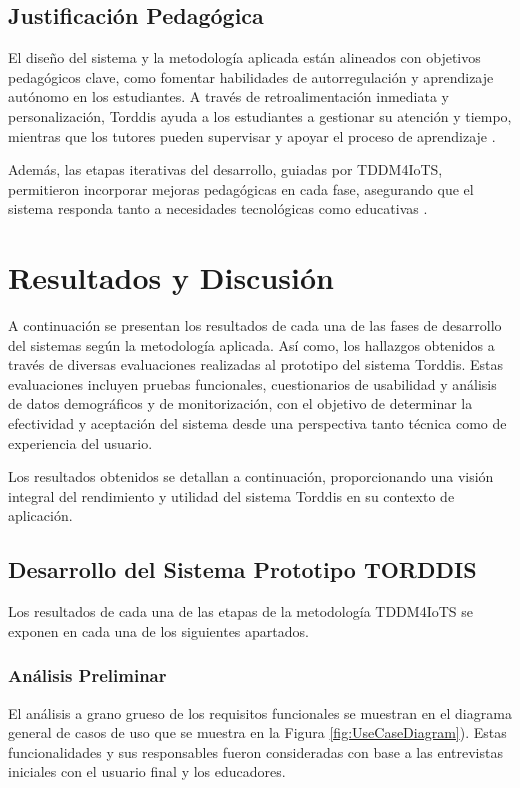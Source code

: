 \documentclass[a4paper,fleqn]{cas-sc}
\begin{document}
		\subsection{Justificación Pedagógica}
			El diseño del sistema y la metodología aplicada están alineados con objetivos pedagógicos clave, como fomentar habilidades de autorregulación y aprendizaje autónomo en los estudiantes. A través de retroalimentación inmediata y personalización, Torddis ayuda a los estudiantes a gestionar su atención y tiempo, mientras que los tutores pueden supervisar y apoyar el proceso de aprendizaje \citep{Chen2025Unpacking}.
			
			Además, las etapas iterativas del desarrollo, guiadas por TDDM4IoTS, permitieron incorporar mejoras pedagógicas en cada fase, asegurando que el sistema responda tanto a necesidades tecnológicas como educativas \citep{Huang2025How}.
			
	\section{Resultados y Discusión}
	\label{seccion:Cinco}
		A continuación se presentan los resultados de cada una de las fases de desarrollo del sistemas según la metodología aplicada. Así como, los hallazgos obtenidos a través de diversas evaluaciones realizadas al prototipo del sistema Torddis. Estas evaluaciones incluyen pruebas funcionales, cuestionarios de usabilidad y análisis de datos demográficos y de monitorización, con el objetivo de determinar la efectividad y aceptación del sistema desde una perspectiva tanto técnica como de experiencia del usuario.
		
		Los resultados obtenidos se detallan a continuación, proporcionando una visión integral del rendimiento y utilidad del sistema Torddis en su contexto de aplicación.
		
		\subsection{Desarrollo del Sistema Prototipo TORDDIS}
			Los resultados de cada una de las etapas de la metodología TDDM4IoTS \citep{Guerrero-Ulloa2020TDDM4IoTS} se exponen en cada una de los siguientes apartados.
			
			\subsubsection{Análisis Preliminar}
				El análisis a grano grueso de los requisitos funcionales se muestran en el diagrama general de casos de uso que se muestra en la Figura \ref{fig:UseCaseDiagram}). Estas funcionalidades y sus responsables fueron consideradas con base a las entrevistas iniciales con el usuario final y los educadores.
				
\end{document}
